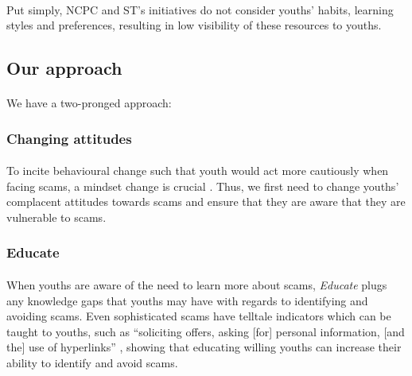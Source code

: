 \documentclass[a4paper]{article}
\begin{document}
\paragraph{} Put simply, NCPC and ST's initiatives do not consider youths'
habits, learning styles and preferences, resulting in low visibility of these
resources to youths.

\subsection{Our approach}
\paragraph{} We have a two-pronged approach:

\subsubsection{Changing attitudes}
\paragraph{} To incite behavioural change such that youth would act more
cautiously when facing scams, a mindset change is crucial
\parencite{ConnorBernal.2020}. Thus, we first need to change youths’ complacent
attitudes towards scams and ensure that they are aware that they are vulnerable
to scams.

\subsubsection{Educate}
\paragraph{} When youths are aware of the need to learn more about scams,
\emph{Educate} plugs any knowledge gaps that youths may have with regards to
identifying and avoiding scams. Even sophisticated scams have telltale
indicators which can be taught to youths, such as ``soliciting offers, asking
[for] personal information, [and the] use of hyperlinks''
\parencite{DatarColeRogers.2014}, showing that educating willing youths can
increase their ability to identify and avoid scams.

\newpage
\end{document}
